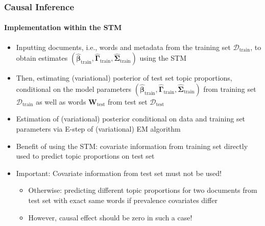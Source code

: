 \documentclass[xcolor=dvipsnames]{beamer}
\begin{document}
\begin{frame}
\frametitle{Causal Inference}
\framesubtitle{Implementation within the STM}
\begin{itemize}
\item Inputting documents, i.e., words and metadata from the training set $\mathcal{D}_{\text{train}}$, to obtain estimates $(\hat{\boldsymbol{\beta}}_{\text{train}}, \hat{\boldsymbol{\Gamma}}_{\text{train}}, \hat{\boldsymbol{\Sigma}}_{\text{train}})$ using the STM
\item Then, estimating (variational) posterior of test set topic proportions, conditional on the model parameters $(\hat{\boldsymbol{\beta}}_{\text{train}}, \hat{\boldsymbol{\Gamma}}_{\text{train}}, \hat{\boldsymbol{\Sigma}}_{\text{train}})$ from training set $\mathcal{D}_{\text{train}}$ as well as words $\boldsymbol{W}_{\text{test}}$ from test set $\mathcal{D}_{\text{test}}$
\item Estimation of (variational) posterior conditional on data and training set parameters via E-step of (variational) EM algorithm
\item Benefit of using the STM: covariate information from training set directly used to predict topic proportions on test set
\item Important: Covariate information from test set must not be used!
	\begin{itemize}
	\item Otherwise: predicting different topic proportions for two documents from test set with exact same words if prevalence covariates differ
	\item However, causal effect should be zero in such a case!
	\end{itemize}
\end{itemize}
\end{frame}
\end{document}
